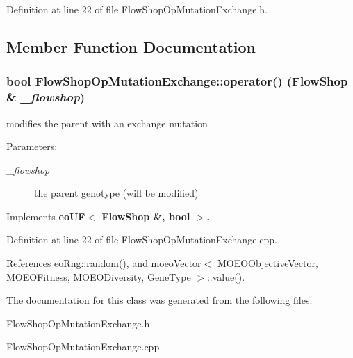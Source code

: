 Definition at line 22 of file Flow\-Shop\-Op\-Mutation\-Exchange.h.

\subsection{Member Function Documentation}
\subsubsection{\setlength{\rightskip}{0pt plus 5cm}bool Flow\-Shop\-Op\-Mutation\-Exchange::operator() (\bf{Flow\-Shop} \& {\em \_\-flowshop})\hspace{0.3cm}{\tt  [virtual]}}\label{classFlowShopOpMutationExchange_bdb2e1d937d788c50f04226265c848bd}


modifies the parent with an exchange mutation 

\begin{Desc}
\item[Parameters:]
\begin{description}
\item[{\em \_\-flowshop}]the parent genotype (will be modified) \end{description}
\end{Desc}


Implements \bf{eo\-UF$<$ Flow\-Shop \&, bool $>$}.

Definition at line 22 of file Flow\-Shop\-Op\-Mutation\-Exchange.cpp.

References eo\-Rng::random(), and moeo\-Vector$<$ MOEOObjective\-Vector, MOEOFitness, MOEODiversity, Gene\-Type $>$::value().

The documentation for this class was generated from the following files:\begin{CompactItemize}
\item 
Flow\-Shop\-Op\-Mutation\-Exchange.h\item 
Flow\-Shop\-Op\-Mutation\-Exchange.cpp\end{CompactItemize}
